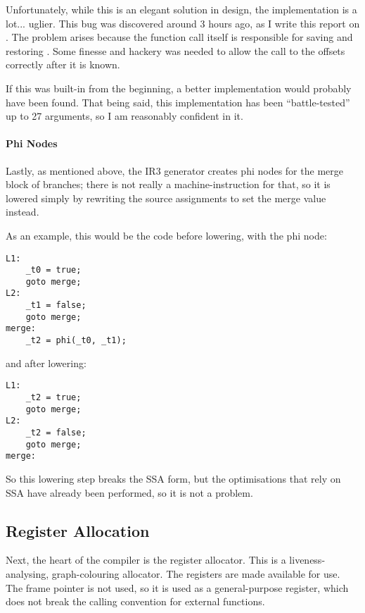 \documentclass[12pt]{article}
\begin{document}
Unfortunately, while this is an elegant solution in design, the implementation is a lot... uglier. This bug was
discovered around 3 hours ago, as I write this report on . The problem arises because the
function call itself is responsible for saving and restoring . Some finesse and hackery was needed to
allow the call to  the offsets correctly after it is known.

If this was built-in from the beginning, a better implementation would probably have been found. That being said,
this implementation has been \enquote{battle-tested} up to 27 arguments, so I am reasonably confident in it.


\paragraph{Phi Nodes}

Lastly, as mentioned above, the IR3 generator creates phi nodes for the merge block of branches; there is not really
a machine-instruction for that, so it is lowered simply by rewriting the source assignments to set the merge value
instead.

As an example, this would be the code before lowering, with the phi node:

\begin{verbatim}
L1:
	_t0 = true;
	goto merge;
L2:
	_t1 = false;
	goto merge;
merge:
	_t2 = phi(_t0, _t1);
\end{verbatim}

and after lowering:

\begin{verbatim}
L1:
	_t2 = true;
	goto merge;
L2:
	_t2 = false;
	goto merge;
merge:
\end{verbatim}

So this lowering step breaks the SSA form, but the optimisations that rely on SSA have already been performed, so it
is not a problem.



\subsection{Register Allocation}

Next, the heart of the compiler is the register allocator. This is a liveness-analysing, graph-colouring allocator. The
registers  are made available for use. The frame pointer is not used, so it is used as
a general-purpose register, which does not break the calling convention for external functions.
\end{document}
